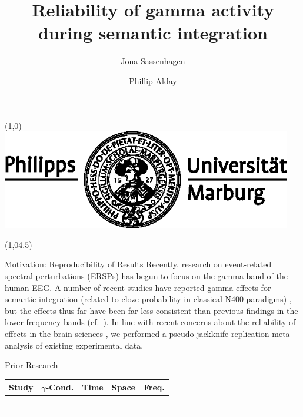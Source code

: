 \documentclass[final]{beamer}
\title{Reliability of gamma activity during semantic integration}
\author{Jona Sassenhagen \and Phillip Alday}
\institute{University of Marburg}
\date{}
\newcommand{\subblock}[1]{\bigskip\textbf{#1}}
\begin{document}
\begin{frame}{} 	
\begin{textblock}{15}(1,0)
\includegraphics[width=5in]{marburg-logo-blackwhite.eps}
\end{textblock}


\begin{textblock}{45}(1,04.5)
\begin{block}{Motivation: Reproducibility of Results}
Recently, research on event-related spectral perturbations (ERSPs) has begun to focus on the gamma band of the human EEG. A number of recent studies have reported gamma effects for semantic integration (related to cloze probability in classical N400 paradigms) \cite{mellemfriedmanmedvedev2013a,wangbastiaansenyang2012a,penolazziangrillijob2009a,hagoort2008a,hagoorthaldbastiaansen2004a}, but the effects thus far have been far less consistent than previous findings in the lower frequency bands (cf.~\cite{heinetammhofmann2006a,davidsonindefrey2007a,roehmschlesewskybornkessel2004a}).
In line with recent concerns about the reliability of effects in the brain sciences \cite{simmonsnelsonsimonsohn2011a,vulpashler2012a}, we performed a pseudo-jackknife replication meta-analysis of existing experimental data. 
\end{block}

\begin{block}{Prior Research}
\begin{tabular}{p{10cm} l c c c }
Study & $\gamma$-Cond. & Time  & Space & Freq. \\
\midrule
\cite{mellemfriedmanmedvedev2013a} & & & &\\
\cite{wangbastiaansenyang2012a} & & & & \\
\cite{penolazziangrillijob2009a} & & & &\\ 
\cite{hagoort2008a} & & & & \\
\cite{hagoorthaldbastiaansen2004a} & & & & \\
\end{tabular}
\end{block}


\end{textblock}
\end{frame}
\end{document}
